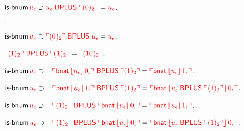 \documentclass[fleqn]{llncs}
\begin{document}
\begin{biformthy}
    \item $\mbox{\sf is-bnum} \, \textcolor{red}{u_\epsilon} \supset
      \textcolor{red}{u_\epsilon \; \mbox{\sf BPLUS} \; \ulcorner(0)_2\urcorner} =
      \textcolor{red}{u_\epsilon}$.

    \item[] $\vdots$

    \iffalse
    \item $\mbox{\sf is-bnum} \, \textcolor{red}{u_\epsilon} \supset
      \textcolor{red}{\ulcorner(0)_2\urcorner \; \mbox{\sf BPLUS} \; u_\epsilon} =
      \textcolor{red}{u_\epsilon}$.

    \item $\textcolor{red}{\ulcorner(1)_2\urcorner \; \mbox{\sf BPLUS} \;
      \ulcorner(1)_2\urcorner} = \textcolor{red}{\ulcorner(10)_2\urcorner}$.

    \item $\mbox{\sf is-bnum} \, \textcolor{red}{u_\epsilon} \supset {}\\
        \hspace*{2ex} \textcolor{red}{\ulcorner\mbox{\sf bnat} \,
            \lfloor u_\epsilon\rfloor \, 0_\iota\urcorner \; \mbox{\sf BPLUS} \;
          \ulcorner(1)_2\urcorner} = \textcolor{red}{\ulcorner\mbox{\sf bnat} \,
            \lfloor u_\epsilon\rfloor \, 1_\iota\urcorner}$.

    \item $\mbox{\sf is-bnum} \, \textcolor{red}{u_\epsilon} \supset {}\\
        \hspace*{2ex} \textcolor{red}{\ulcorner\mbox{\sf bnat} \,
            \lfloor u_\epsilon\rfloor \, 1_\iota\urcorner \; \mbox{\sf BPLUS} \;
          \ulcorner(1)_2\urcorner} = \textcolor{red}{\ulcorner\mbox{\sf bnat} \,
            \lfloor u_\epsilon \; \mbox{\sf BPLUS} \;
              \ulcorner(1)_2\urcorner\rfloor \, 0_\iota\urcorner}$.

    \item $\mbox{\sf is-bnum} \, \textcolor{red}{u_\epsilon} \supset {}\\
        \hspace*{2ex} \textcolor{red}{\ulcorner(1)_2\urcorner \; \mbox{\sf BPLUS} \;
          \ulcorner\mbox{\sf bnat} \, \lfloor u_\epsilon\rfloor \, 0_\iota\urcorner} =
        \textcolor{red}{\ulcorner\mbox{\sf bnat} \, \lfloor u_\epsilon\rfloor \,
            1_\iota\urcorner}$.

    \item $\mbox{\sf is-bnum} \, \textcolor{red}{u_\epsilon} \supset {}\\
        \hspace*{2ex} \textcolor{red}{\ulcorner(1)_2\urcorner \; \mbox{\sf BPLUS} \;
          \ulcorner\mbox{\sf bnat} \, \lfloor u_\epsilon\rfloor \, 0_\iota\urcorner} =
        \textcolor{red}{\ulcorner\mbox{\sf bnat} \, \lfloor u_\epsilon \;
              \mbox{\sf BPLUS} \; \ulcorner(1)_2\urcorner\rfloor \, 0_\iota\urcorner}$.


\end{biformthy}
\end{document}
